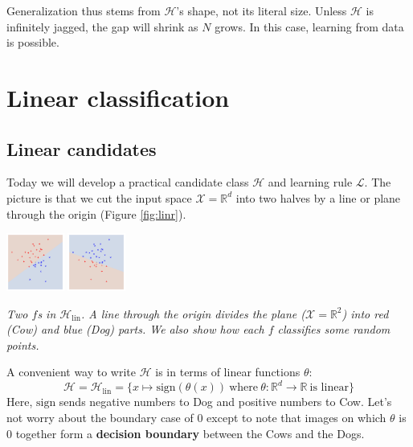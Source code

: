 \documentclass[openany, notitlepage, justified]{tufte-book}
\newcommand{\RR}{\mathbb{R}}
\newcommand{\Hh}{\mathcal{H}}
\newcommand{\Ll}{\mathcal{L}}
\newcommand{\Xx}{\mathcal{X}}
\begin{document}
            Generalization thus stems from $\Hh$'s shape, not its literal size.
            Unless $\Hh$ is infinitely jagged, the gap will shrink as $N$
            grows.  In this case, learning from data is possible.

    \newpage
    \chapter{Linear classification}
        \section{Linear candidates}
            Today we will develop a practical candidate class $\Hh$ and
            learning rule $\Ll$.  The picture is that we cut the input space
            $\Xx=\RR^d$ into two halves by a line or plane through the origin
            (Figure \ref{fig:linr}).
            {\def\par{\let\par\endgraf}\begin{marginfigure}
                \centering
                \includegraphics[height=1.9cm]{db-linr-a}
                \includegraphics[height=1.9cm]{db-linr-b}
                \caption{\emph{
                    Two $f$s in $\Hh_{\text{lin}}$.
                    A line through the origin divides the plane ($\Xx=\RR^2$)
                    into red (Cow) and blue (Dog) parts.  We also show how each
                    $f$ classifies some random points.
                }}
                \label{fig:linr}
            \end{marginfigure}}%
            A convenient way to write $\Hh$ is in terms of linear functions $\theta$:
            $$
                \Hh = \Hh_{\text{lin}} = \{
                    x \mapsto \text{sign}(\theta(x)) 
                    ~\text{where}~
                    \theta : \RR^d \to \RR
                    ~\text{is linear}
                \}
            $$
            Here, $\text{sign}$ sends negative numbers to Dog and positive
            numbers to Cow.  Let's not worry about the boundary case of $0$
            except to note that images on which $\theta$ is $0$ together
            form a \textbf{decision boundary} between the Cows and the Dogs.
\end{document}

